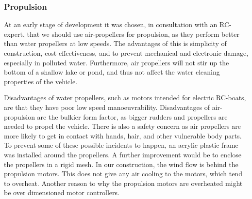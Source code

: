 

\subsubsection{Propulsion}

At an early stage of development it was chosen, in consultation with an RC-expert, that we should use air-propellers for propulsion, as they perform better than water propellers at low speeds. The advantages of this is simplicity of construction, cost effectiveness, and to prevent mechanical and electronic damage, especially in polluted water. %
Furthermore, air propellers will not stir up the bottom of a shallow lake or pond, and thus not affect the water cleaning properties of the vehicle.

Disadvantages of water propellers, such as motors intended for electric RC-boats, are that they have poor low speed manoeuvrability. Disadvantages of air-propulsion are the bulkier form factor, as bigger rudders and propellers are needed to propel the vehicle. There is also a safety concern as air propellers are more likely to get in contact with hands, hair, and other vulnerable body parts. To prevent some of these possible incidents to happen, an acrylic plastic frame was installed around the propellers. A further improvement would be to enclose the propellers in a rigid mesh.
In our construction, the wind flow is behind the propulsion motors. This does not give any air cooling to the motors, which tend to overheat. Another reason to why the propulsion motors are overheated might be over dimensioned motor controllers.

